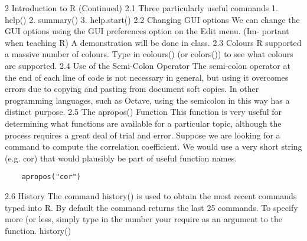 2 Introduction to R (Continued)
2.1 Three particularly useful commands
1. help()
2. summary()
3. help.start()
2.2 Changing GUI options
We can change the GUI options using the GUI preferences option on the Edit menu. (Im-
portant when teaching R) A demonstration will be done in class.
2.3 Colours
R supported a massive number of colours. Type in colours() (or colors()) to see what colours
are supported.
2.4 Use of the Semi-Colon Operator
The semi-colon operator at the end of each line of code is not necessary in general, but using it
overcomes errors due to copying and pasting from document soft copies. In other programming
languages, such as Octave, using the semicolon in this way has a distinct purpose.
2.5 The apropos() Function
This function is very useful for determining what functions are available for a particular topic,
although the process requires a great deal of trial and error. Suppose we are looking for a
command to compute the correlation coefficient. We would use a very short string (e.g. cor)
that would plausibly be part of useful function names.
\begin{framed}
	\begin{verbatim}
	apropos("cor")
	\end{verbatim}
\end{framed}
2.6 History
The command history() is used to obtain the most recent commands typed into R. 
By default the command returns the last 25 commands. To specify more (or less, simply type in the number your require as an argument to the function.
history()
